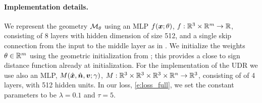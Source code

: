 \documentclass[runningheads]{llncs}
\begin{document}
\paragraph{Implementation details.}
We represent the geometry ${\mathcal{M}}_\theta$ using an MLP $f({\bm{x}};\theta)$,  $f:\mathbb R^3\times\mathbb R^m\rightarrow\mathbb R$, consisting of 8 layers with hidden dimension of size 512, and a single skip connection from the input to the middle layer as in \cite{park2019deepsdf}. We initialize the weights $\theta\in\mathbb R^m$ using the geometric initialization from \cite{atzmon2019sal}; this provides a close to sign distance function already at initialization. For the implementation of the UDR we use also an MLP, $M({\hat{\bm{x}}},{\hat{\bm{n}}},{\bm{v}};\gamma)$, $M:\mathbb R^3\times\mathbb R^3\times \mathbb R^3\times \mathbb R^n \rightarrow \mathbb R^3$, consisting of of 4 layers, with 512 hidden units. In our loss, \eqref{e:loss_full}, we set the constant parameters to be $\lambda=0.1$ and $\tau=5$.
\end{document}
